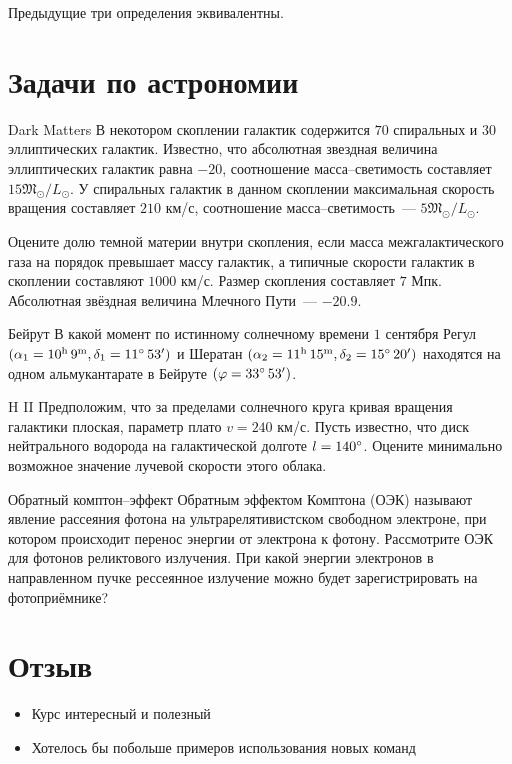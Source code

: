 \documentclass[11pt]{article}
\begin{document}
	\begin{thm}
	Предыдущие три определения эквивалентны.
	\end{thm}
    \section{Задачи по астрономии}
    \begin{problem} {Dark Matters}
    В некотором скоплении галактик содержится $70$ спиральных и $30$ эллиптических галактик. Известно, что абсолютная звездная величина эллиптических галактик равна  $-20$, соотношение масса--светимость составляет $15\mathfrak{M}_\odot / L_\odot$. У спиральных галактик  в данном скоплении максимальная скорость вращения составляет $210$ км/с, соотношение масса--светимость~--- $5\mathfrak{M}_\odot / L_\odot$.\par
    Оцените долю темной материи внутри скопления, если масса межгалактического газа на порядок превышает массу галактик, а типичные скорости галактик в скоплении составляют $1000$ км/с. Размер скопления составляет $7$ Мпк. Абсолютная звёздная величина Млечного Пути~--- $-20.9$.
    \end{problem}
    \begin{problem} {Бейрут}
    В какой момент по истинному солнечному времени $1$ сентября Регул $(\alpha_1 = 10^\text h\,9^\text m, \delta_1 = 11\degree\,53')$ и Шератан $(\alpha_2 = 11^\text h\,15^\text m, \delta_2 = 15\degree\,20')$ находятся на одном альмукантарате в Бейруте $(\varphi = 33\degree\,53')$.
    \end{problem}
    \begin{problem} {H II}
    Предположим, что за пределами солнечного круга кривая вращения галактики плоская, параметр плато $v = 240$ км/с. Пусть известно, что диск нейтрального водорода на галактической долготе $l = 140\degree$. Оцените минимально возможное значение лучевой скорости этого облака.
    \end{problem}
    \begin{problem} {Обратный комптон--эффект}
    Обратным эффектом Комптона (ОЭК) называют явление рассеяния фотона на ультрарелятивистском свободном электроне, при котором происходит  перенос энергии от электрона к фотону. Рассмотрите ОЭК для фотонов реликтового излучения. При какой энергии электронов в направленном пучке рессеянное излучение можно будет зарегистрировать на фотоприёмнике?
    \end{problem}
    \section{Отзыв}
    \renewcommand{\labelitemi}{$\diamond$}
    \begin{itemize}
    	\item Курс интересный и полезный
    	\item Хотелось бы побольше примеров использования новых команд
    \end{itemize}
\end{document}
